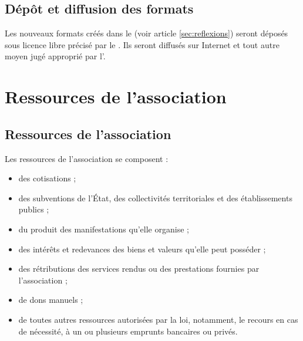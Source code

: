 \documentclass[a4paper,french,10pt]{article}
\newcommand{\article}[1]{\subsection{#1}\addtocounter{article}{1}}
\newcounter{article}
\newcommand{\artref}[1]{article \ref{#1}}
\begin{document}
\article{Dépôt et diffusion des formats}
\label{sec:depot-et-diffusion}
Les nouveaux formats créés dans le \PA{} (voir \artref{sec:reflexions}) seront déposés sous licence libre précisé par le \RI{}. Ils seront diffusés sur Internet et tout autre moyen jugé approprié par l'\AG{}.






\section{Ressources de l’association}

\article{Ressources de l’association}
\label{sec:ressources}
Les ressources de l’association se composent :
\begin{itemize}
\item des cotisations ;
  
\item des subventions de l’État, des collectivités territoriales et
des établissements publics ;

\item du produit des manifestations qu’elle organise ;

\item des intérêts et redevances des biens et valeurs qu’elle peut
posséder ;

\item des rétributions des services rendus ou des prestations fournies
par l'association ;

\item de dons manuels ;

\item de toutes autres ressources autorisées par la loi, notamment, le
recours en cas de nécessité, à un ou plusieurs emprunts bancaires ou
privés.
\end{itemize}
\end{document}
